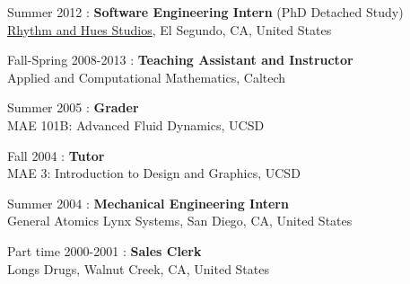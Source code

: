 \begin{samepage}
\noindent Summer 2012 : \textbf{Software Engineering Intern} (PhD Detached Study)\\
\href{http://www.rhythm.com}{Rhythm and Hues Studios},
El Segundo, CA, United States \\
\end{samepage}

\begin{samepage}
\noindent Fall-Spring 2008-2013 : \textbf{Teaching Assistant and Instructor}\\
Applied and Computational Mathematics, Caltech\\
\end{samepage}

\begin{samepage}
\noindent Summer 2005 : \textbf{Grader}\\
 MAE 101B: Advanced Fluid Dynamics, UCSD\\
\end{samepage}

\begin{samepage}
\noindent Fall 2004 : \textbf{Tutor}\\
 MAE 3: Introduction to Design and Graphics, UCSD\\
\end{samepage}

\begin{samepage}
\noindent Summer 2004 : \textbf{Mechanical Engineering Intern}\\
General Atomics Lynx Systems, San Diego, CA, United States\\
\end{samepage}

\begin{samepage}
\noindent Part time 2000-2001 : \textbf{Sales Clerk}\\
Longs Drugs, Walnut Creek, CA, United States
\end{samepage}
